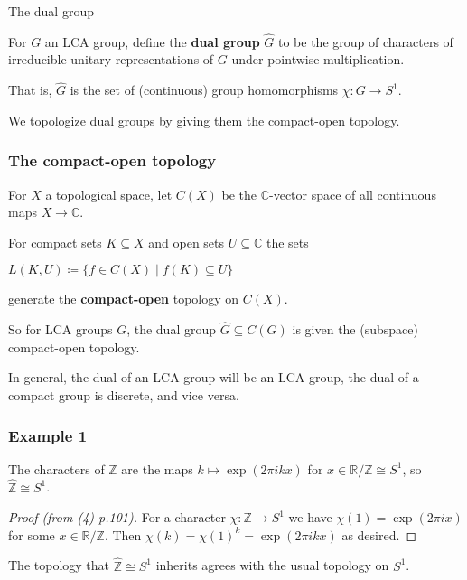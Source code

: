 \documentclass[mathserif
, handout
]{beamer}
\begin{document}
\begin{frame}{The dual group}
    \begin{definition}
        For $G$ an LCA group, define the \textbf{dual group} $\widehat{\hspace{0pt}G}$ to be the group of characters of irreducible unitary representations of $G$ under pointwise multiplication.\pause 
        
        That is, $\widehat{\hspace{0pt}G}$ is the set of (continuous) group homomorphisms $\chi\colon G\to S^1$.
    \end{definition} %
    \pause

    We topologize dual groups by giving them the compact-open topology.
\end{frame}

\begin{frame}
    \frametitle{The compact-open topology}
    \begin{definition}
        For $X$ a topological space, let $C(X)$ be the $\mathbb{C}$-vector space of all continuous maps $X\to \mathbb C$.
        \pause 

        For compact sets $K\subseteq X$ and open sets $U\subseteq \mathbb C$ the sets \begin{center}
            $L(K,U)\coloneqq\{f\in C(X)\mid f(K)\subseteq U\}$
        \end{center} generate the \textbf{compact-open} topology on $C(X)$.
    \end{definition} 
    \pause
    
    So for LCA groups $G$, the dual group $\widehat{\hspace{0pt}G}\subseteq C(G)$ is given the (subspace) compact-open topology.\pause 

    In general, the dual of an LCA group will be an LCA group, the dual of a compact group is discrete, and vice versa.
\end{frame}

\begin{frame}
    \frametitle{Example 1}
The characters of $\mathbb{Z}$ are the maps $k\mapsto \exp(2\pi i k x)$ for $x\in \mathbb{R}/\mathbb{Z}\cong S^1$, so $\widehat{\mathbb{Z}}\cong S^1$. \pause 
\begin{proof}[Proof (from (4) p.101)]
    For a character $\chi\colon \mathbb{Z}\to S^1$ we have $\chi(1) = \exp(2\pi i x)$ for some $x\in \mathbb{R}/\mathbb{Z}$. Then $\chi(k) = \chi(1)^k = \exp(2\pi i k x)$ as desired.
\end{proof}
\pause 

The topology that $\widehat{\mathbb{Z}}\cong S^1$ inherits agrees with the usual topology on $S^1$.
\end{frame}
\end{document}
